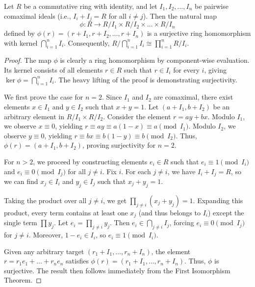 \documentclass[11pt]{scrartcl}
\begin{document}
\begin{theorem}
    Let $R$ be a commutative ring with identity, and let $I_1, I_2, \dots, I_n$ be pairwise comaximal ideals (i.e., $I_i + I_j = R$ for all $i \neq j$). Then the natural map 
    \[ \phi \colon R \to R/I_1 \times R/I_2 \times \dots \times R/I_n \]
    defined by $\phi(r) = (r + I_1, r + I_2, \dots, r + I_n)$ is a surjective ring homomorphism with kernel $\bigcap_{i=1}^n I_i$. Consequently, $R / \bigcap_{i=1}^n I_i \cong \prod_{i=1}^n R/I_i$.
\end{theorem}
\begin{proof}
    The map $\phi$ is clearly a ring homomorphism by component-wise evaluation. Its kernel consists of all elements $r \in R$ such that $r \in I_i$ for every $i$, giving $\ker \phi = \bigcap_{i=1}^n I_i$. The heavy lifting of the proof is demonstrating surjectivity.
    
    We first prove the case for $n=2$. Since $I_1$ and $I_2$ are comaximal, there exist elements $x \in I_1$ and $y \in I_2$ such that $x + y = 1$. Let $(a + I_1, b + I_2)$ be an arbitrary element in $R/I_1 \times R/I_2$. Consider the element $r = ay + bx$. 
    Modulo $I_1$, we observe $x \equiv 0$, yielding $r \equiv ay \equiv a(1-x) \equiv a \pmod{I_1}$. 
    Modulo $I_2$, we observe $y \equiv 0$, yielding $r \equiv bx \equiv b(1-y) \equiv b \pmod{I_2}$. 
    Thus, $\phi(r) = (a + I_1, b + I_2)$, proving surjectivity for $n=2$.
    
    For $n > 2$, we proceed by constructing elements $e_i \in R$ such that $e_i \equiv 1 \pmod{I_i}$ and $e_i \equiv 0 \pmod{I_j}$ for all $j \neq i$. Fix $i$. For each $j \neq i$, we have $I_i + I_j = R$, so we can find $x_j \in I_i$ and $y_j \in I_j$ such that $x_j + y_j = 1$. 
    
    Taking the product over all $j \neq i$, we get $\prod_{j \neq i} (x_j + y_j) = 1$. Expanding this product, every term contains at least one $x_j$ (and thus belongs to $I_i$) except the single term $\prod y_j$. Let $e_i = \prod_{j \neq i} y_j$. Then $e_i \in \bigcap_{j \neq i} I_j$, forcing $e_i \equiv 0 \pmod{I_j}$ for $j \neq i$. Moreover, $1 - e_i \in I_i$, so $e_i \equiv 1 \pmod{I_i}$.
    
    Given any arbitrary target $(r_1 + I_1, \dots, r_n + I_n)$, the element $r = r_1 e_1 + \dots + r_n e_n$ satisfies $\phi(r) = (r_1 + I_1, \dots, r_n + I_n)$. Thus, $\phi$ is surjective. The result then follows immediately from the First Isomorphism Theorem.
\end{proof}
\end{document}
